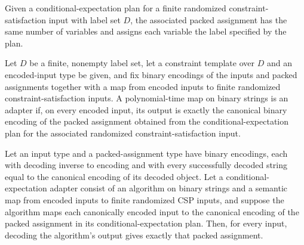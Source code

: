 \begin{definition}
\label{FABL.FiniteRandomizedCSPInput.ConditionalExpectationPlan.toPackedAssignment}
\leanok
{}
Given a conditional-expectation plan for a finite randomized constraint-satisfaction
input with label set $D$, the associated packed assignment has the same number of
variables and assigns each variable the label specified by the plan.
\end{definition}

\begin{definition}
\label{FABL.ConditionalExpectationPolytimeAdapter}
\leanok
{}
Let $D$ be a finite, nonempty label set, let a constraint template over $D$ and an
encoded-input type be given, and fix binary encodings of the inputs and packed
assignments together with a map from encoded inputs to finite randomized
constraint-satisfaction inputs. A polynomial-time map on binary strings is an adapter
if, on every encoded input, its output is exactly the canonical binary encoding of the
packed assignment obtained from the conditional-expectation plan for the associated
randomized constraint-satisfaction input.
\end{definition}

\begin{theorem}
\label{FABL.ConditionalExpectationPolytimeAdapter.decode_algorithm}
\leanok
{}
Let an input type and a packed-assignment type have binary encodings, each with decoding
inverse to encoding and with every successfully decoded string equal to the canonical
encoding of its decoded object. Let a conditional-expectation adapter consist of an
algorithm on binary strings and a semantic map from encoded inputs to finite randomized
CSP inputs, and suppose the algorithm maps each canonically encoded input to the
canonical encoding of the packed assignment in its conditional-expectation plan. Then,
for every input, decoding the algorithm's output gives exactly that packed assignment.
\end{theorem}

